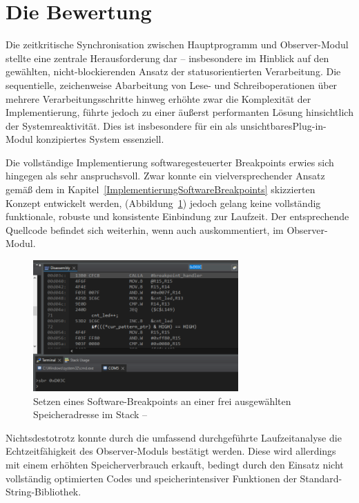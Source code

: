 
\newpage
\section{Die Bewertung}
\label{sec:Bewertung}
Die zeitkritische Synchronisation zwischen Hauptprogramm und Observer-Modul stellte eine zentrale Herausforderung dar -- insbesondere im Hinblick auf den gew\"ahlten, nicht-blockierenden Ansatz der statusorientierten Verarbeitung. Die sequentielle, zeichenweise Abarbeitung von Lese- und Schreiboperationen \"uber mehrere Verarbeitungsschritte hinweg erh\"ohte zwar die Komplexit\"at der Implementierung, f\"uhrte jedoch zu einer \"au{\ss}erst performanten L\"osung hinsichtlich der Systemreaktivit\"at. Dies ist insbesondere f\"ur ein als \grqq unsichtbares\grqq Plug-in-Modul konzipiertes System essenziell.

Die vollst\"andige Implementierung softwaregesteuerter Breakpoints erwies sich hingegen als sehr anspruchsvoll. Zwar konnte ein vielversprechender Ansatz gem\"a{\ss} dem in Kapitel~\ref{ImplementierungSoftwareBreakpoints} skizzierten Konzept entwickelt werden, (\Vgl Abbildung~\ref{fig:software_breakpoint}) jedoch gelang keine vollst\"andig funktionale, robuste und konsistente Einbindung zur Laufzeit. Der entsprechende Quellcode befindet sich weiterhin, wenn auch auskommentiert, im Observer-Modul.

\begin{figure}[h!]
	\centering
	\includegraphics[width=0.7\textwidth]{../Bilder/ObserverModule/set_breakpoint.png}
	\caption{Setzen eines Software-Breakpoints an einer frei ausgew\"ahlten Speicheradresse im Stack -- }
	\label{fig:software_breakpoint}
\end{figure}

Nichtsdestotrotz konnte durch die umfassend durchgef\"uhrte Laufzeitanalyse die Echtzeitf\"ahigkeit des Observer-Moduls best\"atigt werden. Diese wird allerdings mit einem erh\"ohten Speicherverbrauch erkauft, bedingt durch den Einsatz nicht vollst\"andig optimierten Codes und speicherintensiver Funktionen der Standard-String-Bibliothek.

